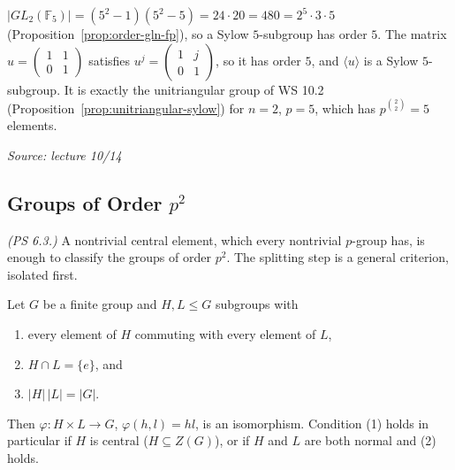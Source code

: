 \documentclass[11pt]{report}
\newcommand{\srcline}[1]{\par\hfill{\footnotesize\textit{Source: #1}}}
\begin{document}
\begin{exbox}\label{ex:sylow-gl2-f5}
$|GL_2(\mathbb{F}_5)| = (5^2 - 1)(5^2 - 5) = 24 \cdot 20 = 480 = 2^5 \cdot 3 \cdot 5$ (Proposition~\ref{prop:order-gln-fp}), so a Sylow $5$-subgroup has order $5$. The matrix $u = \begin{pmatrix} 1 & 1 \\ 0 & 1 \end{pmatrix}$ satisfies $u^j = \begin{pmatrix} 1 & j \\ 0 & 1 \end{pmatrix}$, so it has order $5$, and $\langle u \rangle$ is a Sylow $5$-subgroup. It is exactly the unitriangular group of WS 10.2 (Proposition~\ref{prop:unitriangular-sylow}) for $n = 2$, $p = 5$, which has $p^{\binom{2}{2}} = 5$ elements.
\srcline{lecture 10/14}
\end{exbox}

\subsection{\texorpdfstring{Groups of Order $p^2$}{Groups of Order p²}}\label{sub:order-p-squared}

\textit{(PS 6.3.)} A nontrivial central element, which every nontrivial $p$-group has, is enough to classify the groups of order $p^2$. The splitting step is a general criterion, isolated first.

\begin{lembox}\label{lem:internal-direct-product}
Let $G$ be a finite group and $H, L \leq G$ subgroups with
\begin{enumerate}
    \item every element of $H$ commuting with every element of $L$,
    \item $H \cap L = \{e\}$, and
    \item $|H|\,|L| = |G|$.
\end{enumerate}
Then $\varphi: H \times L \to G$, $\varphi(h, l) = hl$, is an isomorphism. Condition (1) holds in particular if $H$ is central ($H \subseteq Z(G)$), or if $H$ and $L$ are both normal and (2) holds.
\end{lembox}
\end{document}
